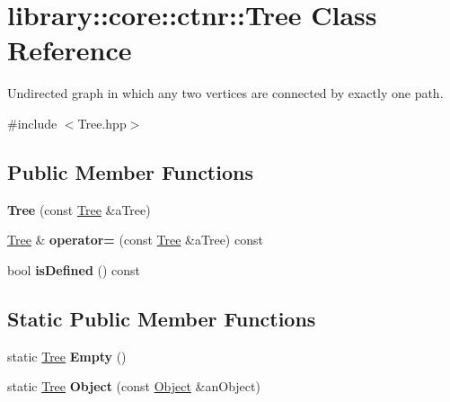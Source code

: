 \hypertarget{classlibrary_1_1core_1_1ctnr_1_1_tree}{}\section{library\+:\+:core\+:\+:ctnr\+:\+:Tree Class Reference}
\label{classlibrary_1_1core_1_1ctnr_1_1_tree}


Undirected graph in which any two vertices are connected by exactly one path.  




{\ttfamily \#include $<$Tree.\+hpp$>$}

\subsection*{Public Member Functions}
\begin{DoxyCompactItemize}
\item 
\mbox{\label{classlibrary_1_1core_1_1ctnr_1_1_tree_ac5fc40b3ef35ab52bc0dbdbf807edb46}} 
{\bfseries Tree} (const \hyperlink{classlibrary_1_1core_1_1ctnr_1_1_tree}{Tree} \&a\+Tree)
\item 
\mbox{\label{classlibrary_1_1core_1_1ctnr_1_1_tree_a5cc9a5ca245a3d9419caf9f1cd748c9d}} 
\hyperlink{classlibrary_1_1core_1_1ctnr_1_1_tree}{Tree} \& {\bfseries operator=} (const \hyperlink{classlibrary_1_1core_1_1ctnr_1_1_tree}{Tree} \&a\+Tree) const
\item 
\mbox{\label{classlibrary_1_1core_1_1ctnr_1_1_tree_a7fe044b38601503dca0f2720edead189}} 
bool {\bfseries is\+Defined} () const
\end{DoxyCompactItemize}
\subsection*{Static Public Member Functions}
\begin{DoxyCompactItemize}
\item 
\mbox{\label{classlibrary_1_1core_1_1ctnr_1_1_tree_a2ddcc031c7c6e3a97a2dd1ab82231f00}} 
static \hyperlink{classlibrary_1_1core_1_1ctnr_1_1_tree}{Tree} {\bfseries Empty} ()
\item 
\mbox{\label{classlibrary_1_1core_1_1ctnr_1_1_tree_a5e90e14573c52b7f00233200c76e9e82}} 
static \hyperlink{classlibrary_1_1core_1_1ctnr_1_1_tree}{Tree} {\bfseries Object} (const \hyperlink{classlibrary_1_1core_1_1ctnr_1_1_object}{Object} \&an\+Object)
\end{DoxyCompactItemize}
